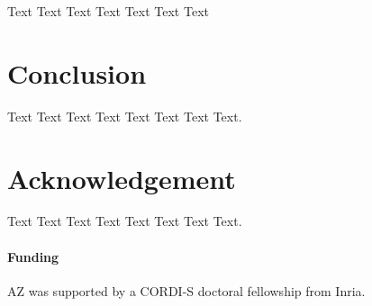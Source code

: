 \documentclass{bioinfo}
\begin{document}
Text Text Text Text Text Text  Text 



\section{Conclusion}
Text Text Text Text Text Text  Text Text.



\section*{Acknowledgement}
Text Text Text Text Text Text  Text Text.

\paragraph{Funding\textcolon} AZ was supported by a CORDI-S doctoral fellowship from Inria.

%
%
%
%
%
%
%
%
%


%
%
%
%
%
%
%
\end{document}
